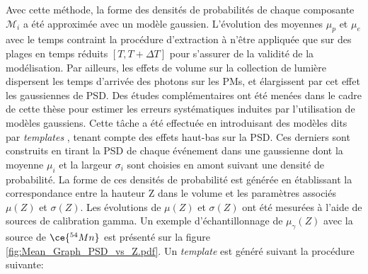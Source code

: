 Avec cette méthode, la forme des densités de probabilités de chaque composante $\mathcal{M}_i$ a été approximée avec un modèle gaussien. L'évolution des moyennes $\mu_p$ et $\mu_e$ avec le temps contraint la procédure d'extraction à n'être appliquée que sur des plages en temps réduits $\left[T, T+\Delta T\right]$ pour s'assurer de la validité de la modélisation. Par ailleurs, les effets de volume sur la collection de lumière dispersent les temps d'arrivée des photons sur les PMs, et élargissent par cet effet les gaussiennes de PSD. Des études complémentaires ont été menées dans le cadre de cette thèse pour estimer les erreurs systématiques induites par l'utilisation de modèles gaussiens. Cette tâche a été effectuée en introduisant des modèles dits par \og \textit{templates} \fg{}, tenant compte des effets haut-bas sur la PSD. Ces derniers sont construits en tirant la PSD de chaque événement dans une gaussienne dont la moyenne $\mu_i$ et la largeur $\sigma_i$ sont choisies en amont suivant une densité de probabilité. La forme de ces densités de probabilité est générée en établissant la correspondance entre la hauteur Z dans le volume et les paramètres associés $\mu(Z)$ et $\sigma(Z)$. Les évolutions de $\mu(Z)$ et $\sigma(Z)$ ont été mesurées à l'aide de sources de calibration gamma. Un exemple d'échantillonnage de $\mu_\gamma(Z)$ avec la source de $\ce{^{54}Mn}$ est présenté sur la figure \ref{fig:Mean_Graph_PSD_vs_Z.pdf}. Un \textit{template} est généré suivant la procédure suivante:\\

